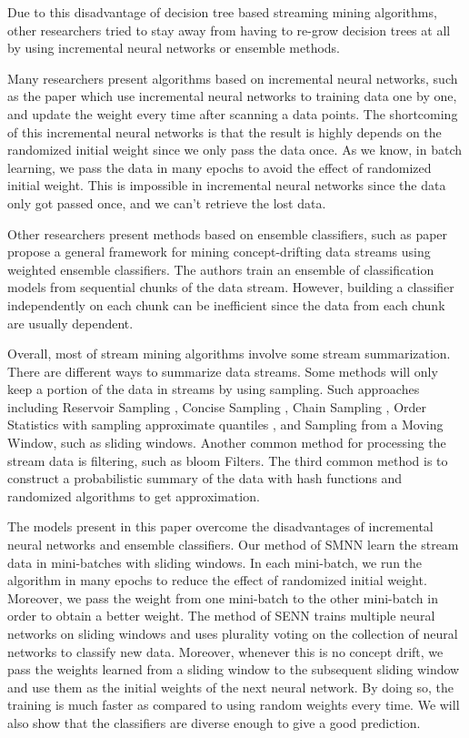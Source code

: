 \documentclass[conference]{IEEEtran}
\begin{document}
		Due to this disadvantage of decision tree based streaming mining algorithms, other researchers tried to stay away from having to re-grow decision trees at all by using incremental neural networks or ensemble methods.
		
		Many researchers present algorithms based on incremental neural networks, such as the paper \cite{NN1,NN2,NN3,NN4} which use incremental neural networks to training data one by one, and update the weight every time after scanning a data points. The shortcoming of this incremental neural networks is that the result is highly depends on the randomized initial weight since we only pass the data once. As we know, in batch learning, we pass the data in many epochs to avoid the effect of randomized initial weight. This is impossible in incremental neural networks since the data only got passed once, and we can't retrieve the lost data.
		
		Other researchers present methods based on ensemble classifiers, such as paper \cite{ensemble1} propose a general framework for mining concept-drifting data streams using weighted ensemble classifiers. The authors train an ensemble of classification models from sequential chunks of the data stream. However, building a classifier independently on each chunk can be inefficient since the data from each chunk are usually dependent. 
		
		Overall, most of stream mining algorithms involve some stream summarization. There are different ways to summarize data streams. Some methods will only keep a portion of the data in streams by using sampling. Such approaches including Reservoir Sampling \cite{vitter}, Concise Sampling \cite{Gibbons}, Chain Sampling \cite{Babcock}, Order Statistics with sampling approximate quantiles \cite{Manku}, and Sampling from a Moving Window, such as sliding windows. Another common method for processing the stream data is filtering, such as bloom Filters. The third common method is to construct a probabilistic summary of the data with hash functions and randomized algorithms to get approximation. 
		
		
		The models present in this paper overcome the disadvantages of incremental neural networks and ensemble classifiers.  Our method of SMNN learn the stream data in mini-batches with sliding windows. In each mini-batch, we run the algorithm in many epochs to reduce the effect of randomized initial weight. Moreover, we pass the weight from one mini-batch to the other mini-batch in order to obtain a better weight. The method of SENN trains multiple neural networks on sliding windows and uses plurality voting on the collection of neural networks to classify new data. Moreover, whenever this is no concept drift, we pass the weights learned from a sliding window to the subsequent sliding window and use them as the initial weights of the next neural network. By doing so, the training  is much faster as compared to using random weights every time. We will also show that the classifiers are diverse enough to give a good prediction. 
		
\end{document}
